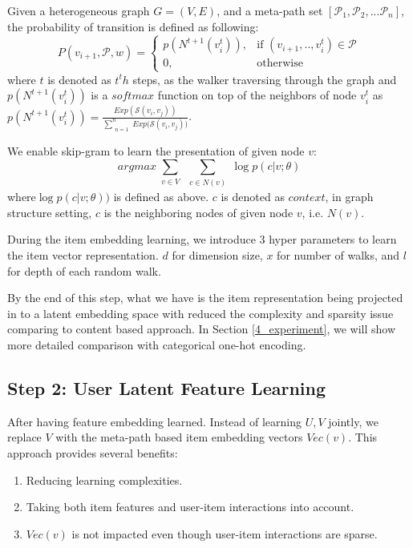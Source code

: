 Given a heterogeneous graph $G = (V,E)$, and a meta-path set $[\mathcal{P}_1, \mathcal{P}_2, ... \mathcal{P}_n]$, the probability of transition is defined as following:
\begin{equation}\label{hetewalker}
    P(v_{i+1},\mathcal{P},w)= 
        \begin{cases}
            p({N^{t+1}(v_{i}^t)}),& \text{if } (v_{i+1}, .., v_{i}^t) \in \mathcal{P} \\
            0,              & \text{otherwise}
        \end{cases}
\end{equation}
where $t$ is denoted as $t^th$ steps, as the walker traversing through the graph and $p({N^{t+1}(v_{i}^t)})$ is a $softmax$ function on top of the neighbors of node $v_{i}^t$ as $p({N^{t+1}(v_{i}^t)}) = \frac{Exp(\mathcal{S}(v_i,v_j))}{\sum\limits_{\substack{n=1}}^{n} {Exp(\mathcal{S}(v_i,v_j)})}$.

We enable skip-gram \cite{mikolov2013distributed} to learn the presentation of given node $v$:
\begin{equation}\label{skipgram}
    arg max
    \sum\limits_{\substack{v \in V}}
    \sum\limits_{\substack{c \in N(v)}}
    \log p({c|v;\theta})
\end{equation}
where$\log p({c|v;\theta}))$ is defined as above. $c$ is denoted as $context$, in graph structure setting, $c$ is the neighboring nodes of given node $v$, i.e. $N(v)$. 

During the item embedding learning, we introduce 3 hyper parameters to learn the item vector representation. $d$ for dimension size, $x$ for number of walks, and $l$ for depth of each random walk.

By the end of this step, what we have is the item representation being projected in to a latent embedding space with reduced the complexity and sparsity issue comparing to content based approach. In Section \ref{4_experiment}, we will show more detailed comparison with categorical one-hot encoding.

\subsection{Step 2: User Latent Feature Learning}\label{3PCC}
After having feature embedding learned. Instead of learning $U, V$ jointly, we replace $V$ with the meta-path based item embedding vectors $Vec(v)$. This approach provides several benefits:

\begin{enumerate}
    \item Reducing learning complexities.
    \item Taking both item features and user-item interactions into account.
    \item $Vec(v)$ is not impacted even though user-item interactions are sparse.
\end{enumerate}

